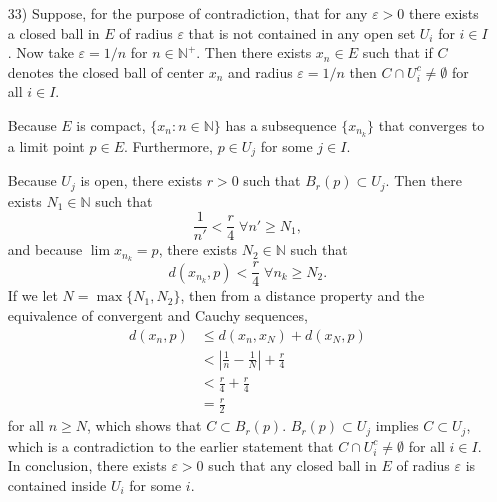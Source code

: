 \documentclass[a4paper,12pt]{article}
\begin{document}
\begin{enumerate}
        \item[33)]
            Suppose, for the purpose of contradiction, that for any $\varepsilon > 0$ there exists a closed ball in $E$ of radius $\varepsilon$ that is not contained in any open set $U_i$ for $i \in I$. Now take $\varepsilon = 1 / n$ for $n \in \mathbb{N^+}$. Then there exists $x_n \in E$ such that if $C$ denotes the closed ball of center $x_n$ and radius $\varepsilon = 1 / n$ then $C \cap U_i^c \neq \emptyset$ for all $i \in I$. \par
            Because $E$ is compact, $\{ x_n : n \in \mathbb{N} \}$ has a subsequence $\{ x_{n_k} \}$ that converges to a limit point $p \in E$. Furthermore, $p \in U_j$ for some $j \in I$. \par
            Because $U_j$ is open, there exists $r > 0$ such that $B_r(p) \subset U_j$. Then there exists $N_1 \in \mathbb{N}$ such that
            \[
                \frac{1}{n'} < \frac{r}{4} \; \forall n' \geq N_1,
            \]
            and because $\lim{x_{n_k}} = p$, there exists $N_2 \in \mathbb{N}$ such that
            \[
                d(x_{n_k}, p) < \frac{r}{4} \; \forall n_k \geq N_2.
            \]
            If we let $N = \max\{ N_1, N_2 \}$, then from a distance property and the equivalence of convergent and Cauchy sequences,
            \begin{align*}
                d(x_n, p) &\leq d(x_n, x_N) + d(x_N, p) \\
                          &< \left| \frac{1}{n} - \frac{1}{N} \right| + \frac{r}{4} \\
                          &< \frac{r}{4} + \frac{r}{4} \\
                          &= \frac{r}{2}
            \end{align*}
            for all $n \geq N$, which shows that $C \subset B_r(p)$. $B_r(p) \subset U_j$ implies $C \subset U_j$, which is a contradiction to the earlier statement that $C \cap U_i^c \neq \emptyset$ for all $i \in I$. In conclusion, there exists $\varepsilon > 0$ such that any closed ball in $E$ of radius $\varepsilon$ is contained inside $U_i$ for some $i$.


\end{enumerate}
\end{document}
